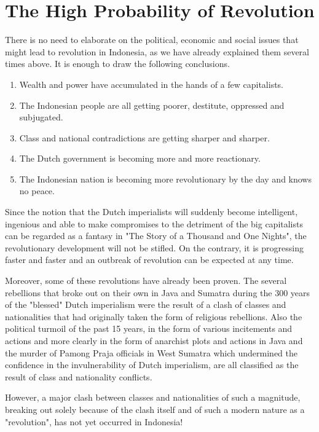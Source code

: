 \section{The High Probability of Revolution}

There is no need to elaborate on the political, economic and social issues 
that might lead to revolution in Indonesia, as we have already explained 
them several times above. It is enough to draw the following conclusions.\nline

\begin{enumerate}
    \item Wealth and power have accumulated in the hands of a few capitalists.
    \item The Indonesian people are all getting poorer, destitute, oppressed and subjugated.
    \item Class and national contradictions are getting sharper and sharper.
    \item The Dutch government is becoming more and more reactionary.
    \item The Indonesian nation is becoming more revolutionary by the day and knows no peace.
\end{enumerate}

Since the notion that the Dutch imperialists will suddenly become intelligent, ingenious and able to make 
compromises to the detriment of the big capitalists can be regarded as a fantasy in "The Story of a Thousand and One Nights", 
the revolutionary development will not be stifled. On the contrary, it is progressing faster and faster 
and an outbreak of revolution can be expected at any time.\nline

Moreover, some of these revolutions have already been proven. The several rebellions that broke out on 
their own in Java and Sumatra during the 300 years of the "blessed" Dutch imperialism were the result 
of a clash of classes and nationalities that had originally taken the form of religious rebellions. 
Also the political turmoil of the past 15 years, in the form of various incitements and actions and 
more clearly in the form of anarchist plots and actions in Java and the murder of Pamong Praja officials 
in West Sumatra which undermined the confidence in the invulnerability of Dutch imperialism, are all 
classified as the result of class and nationality conflicts.\nline

However, a major clash between classes and nationalities of such a magnitude, breaking out solely 
because of the clash itself and of such a modern nature as a "revolution", has not yet occurred in Indonesia!\nline

